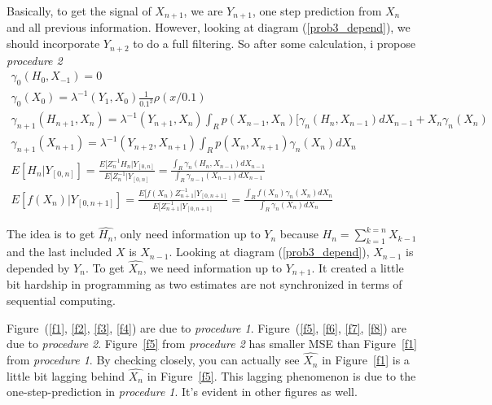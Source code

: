 \documentclass[a4paper,10pt]{article}
\begin{document}
Basically, to get the signal of $X_{n+1}$, we are $Y_{n+1}$, one step prediction from $X_n$ and all previous information. However, looking at diagram (\ref{prob3_depend}), we should incorporate $Y_{n+2}$ to do a full filtering. So after some calculation, i propose \emph{procedure 2}
\begin{eqnarray}
\gamma_0(H_0, X_{-1}) = 0  \\
\gamma_0(X_0) = \lambda^{-1}(Y_{1}, X_{0})\frac{1}{0.1^2}\rho(x/0.1)  \\
\gamma_{n+1}(H_{n+1}, X_{n}) =  \lambda^{-1}(Y_{n+1}, X_{n}) \int_R p(X_{n-1}, X_n)[\gamma_n(H_n, X_{n-1})dX_{n-1} + X_n \gamma_n(X_n)  \\
\gamma_{n+1}(X_{n+1}) = \lambda^{-1}(Y_{n+2}, X_{n+1}) \int_R p(X_n, X_{n+1}) \gamma_n(X_n)dX_n  \\
E[H_n|Y_{[0,n]}] = \frac{E[Z_n^{-1}H_n|Y_{[0,n]}}{E[Z_n^{-1}|Y_{[0,n]}} = \frac{\int_R \gamma_n(H_n, X_{n-1}) dX_{n-1}}{\int_R \gamma_{n-1}(X_{n-1})dX_{n-1}} \\
E[f(X_n) | Y_{[0,n+1]}] = \frac{E[f(X_n)Z_{n+1}^{-1}|Y_{[0,n+1]}}{E[Z_{n+1}^{-1}|Y_{[0,n+1]}} = \frac{\int_R f(X_n)\gamma_n(X_n)dX_n }{\int_R \gamma_n(X_n)dX_n}
\end{eqnarray}

The idea is to get $\hat{H_n}$, only need information up to $Y_n$ because $H_n = \sum_{k=1}^{k=n} X_{k-1}$ and the last included $X$ is $X_{n-1}$. Looking at diagram (\ref{prob3_depend}), $X_{n-1}$ is depended by $Y_n$. To get $\hat{X_n}$, we need information up to $Y_{n+1}$. It created a little bit hardship in programming as two estimates are not synchronized in terms of sequential computing.

Figure~(\ref{f1}, \ref{f2}, \ref{f3}, \ref{f4}) are due to \emph{procedure 1}. Figure~(\ref{f5}, \ref{f6}, \ref{f7}, \ref{f8}) are due to \emph{procedure 2}. Figure~\ref{f5} from \emph{procedure 2} has smaller MSE than Figure~\ref{f1} from \emph{procedure 1}. By checking closely, you can actually see $\hat{X_n}$ in Figure~\ref{f1} is a little bit lagging behind $\hat{X_n}$ in Figure~\ref{f5}. This lagging phenomenon is due to the one-step-prediction in \emph{procedure 1}. It's evident in other figures as well.
\end{document}
